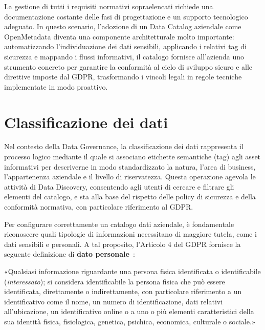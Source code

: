 La gestione di tutti i requisiti normativi sopraelencati richiede una documentazione costante delle fasi di progettazione e un supporto tecnologico adeguato. 
In questo scenario, l'adozione di un Data Catalog aziendale come OpenMetadata diventa una componente architetturale molto importante: automatizzando l'individuazione dei dati sensibili, 
applicando i relativi tag di sicurezza e mappando i flussi informativi, il catalogo fornisce all'azienda uno strumento concreto per garantire la conformità al ciclo di sviluppo sicuro  
e alle direttive imposte dal GDPR, trasformando i vincoli legali in regole tecniche implementate in modo proattivo.


\section{Classificazione dei dati}
Nel contesto della Data Governance, la classificazione dei dati rappresenta il processo logico mediante il quale si associano etichette semantiche (tag) agli asset informativi 
per descriverne in modo standardizzato la natura, l'area di business, l'appartenenza aziendale e il livello di riservatezza. Questa operazione agevola le attività di Data Discovery, 
consentendo agli utenti di cercare e filtrare gli elementi del catalogo, e sta alla base del rispetto delle policy di sicurezza e della conformità normativa, con particolare riferimento al GDPR.

Per configurare correttamente un catalogo dati aziendale, è fondamentale riconoscere quali tipologie di informazioni necessitano di maggiore tutela, come i 
dati sensibili e personali. A tal proposito, l'Articolo 4 del GDPR fornisce la seguente definizione di \textbf{dato personale}~\cite{site:gdpr}:
\begin{quoting}
    «Qualsiasi informazione riguardante una persona fisica identificata o identificabile (\emph{interessato}); si considera identificabile la persona fisica che può essere identificata, direttamente o indirettamente, con particolare riferimento a un identificativo come 
    il nome, un numero di identificazione, dati relativi all'ubicazione, un identificativo online o a uno o più elementi caratteristici della sua identità fisica, fisiologica, genetica, psichica, economica, culturale o sociale.»
\end{quoting}

